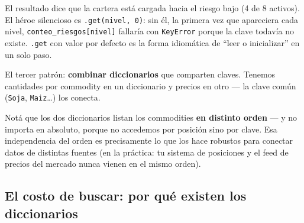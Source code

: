 \documentclass[
  spanish,
  letterpaper,
  DIV=11,
  numbers=noendperiod]{scrreprt}
\newenvironment{Shaded}{\begin{snugshade}}{\end{snugshade}}
\newcommand{\NormalTok}[1]{\textcolor[rgb]{0.00,0.23,0.31}{#1}}
\begin{document}
El resultado dice que la cartera está cargada hacia el riesgo bajo (4 de
8 activos). El héroe silencioso es \texttt{.get(nivel,\ 0)}: sin él, la
primera vez que apareciera cada nivel,
\texttt{conteo\_riesgos{[}nivel{]}} fallaría con \texttt{KeyError}
porque la clave todavía no existe. \texttt{.get} con valor por defecto
es la forma idiomática de ``leer o inicializar'' en un solo paso.

El tercer patrón: \textbf{combinar diccionarios} que comparten claves.
Tenemos cantidades por commodity en un diccionario y precios en otro ---
la clave común (\texttt{\textquotesingle{}Soja\textquotesingle{}},
\texttt{\textquotesingle{}Maiz\textquotesingle{}}\ldots) los conecta.

\begin{Shaded}
\end{Shaded}

Notá que los dos diccionarios listan los commodities \textbf{en distinto
orden} --- y no importa en absoluto, porque no accedemos por posición
sino por clave. Esa independencia del orden es precisamente lo que los
hace robustos para conectar datos de distintas fuentes (en la práctica:
tu sistema de posiciones y el feed de precios del mercado nunca vienen
en el mismo orden).

\subsection{El costo de buscar: por qué existen los
diccionarios}\label{el-costo-de-buscar-por-quuxe9-existen-los-diccionarios}
\end{document}

